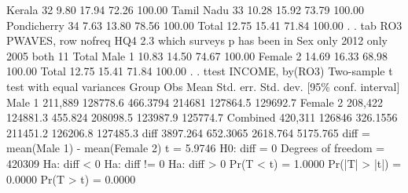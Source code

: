             Kerala 32 {\VBAR}      9.80      17.94      72.26 {\VBAR}    100.00 
        Tamil Nadu 33 {\VBAR}     10.28      15.92      73.79 {\VBAR}    100.00 
       Pondicherry 34 {\VBAR}      7.63      13.80      78.56 {\VBAR}    100.00 
                Total {\VBAR}     12.75      15.41      71.84 {\VBAR}    100.00 
{\smallskip}
. 
. tab RO3 PWAVES, row nofreq
{\smallskip}
   HQ4 2.3 {\VBAR}   which surveys p has been in
       Sex {\VBAR} only 2012  only 2005    both 11 {\VBAR}     Total
    Male 1 {\VBAR}     10.83      14.50      74.67 {\VBAR}    100.00 
  Female 2 {\VBAR}     14.69      16.33      68.98 {\VBAR}    100.00 
     Total {\VBAR}     12.75      15.41      71.84 {\VBAR}    100.00 
{\smallskip}
. 
. ttest INCOME, by(RO3)
{\smallskip}
Two-sample t test with equal variances
   Group {\VBAR}     Obs        Mean    Std. err.   Std. dev.   [95\% conf. interval]
  Male 1 {\VBAR} 211,889    128778.6    466.3794      214681    127864.5    129692.7
Female 2 {\VBAR} 208,422    124881.3     455.824    208098.5    123987.9    125774.7
Combined {\VBAR} 420,311      126846    326.1556    211451.2    126206.8    127485.3
    diff {\VBAR}            3897.264    652.3065                2618.764    5175.765
    diff = mean(Male 1) - mean(Female 2)                          t =   5.9746
H0: diff = 0                                     Degrees of freedom =   420309
{\smallskip}
    Ha: diff < 0                 Ha: diff != 0                 Ha: diff > 0
 Pr(T < t) = 1.0000         Pr(|T| > |t|) = 0.0000          Pr(T > t) = 0.0000
{\smallskip}

